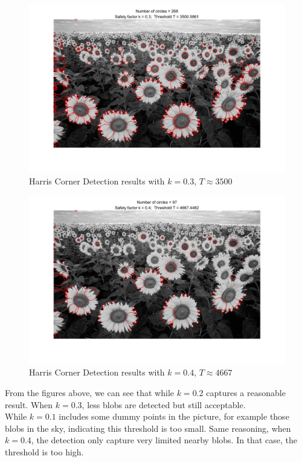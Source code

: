 \documentclass[letterpaper]{article}
\begin{document}
\begin{figure}[H]
\begin{center}
\includegraphics[width = 14cm]{HW4_q2_k_03.jpeg}
\end{center}
\caption{Harris Corner Detection results with $k=0.3$, $T\approx 3500$}
\label{HW4_q2_k_03}
\end{figure}

\begin{figure}[H]
\begin{center}
\includegraphics[width = 14cm]{HW4_q2_k_04.jpeg}
\end{center}
\caption{Harris Corner Detection results with $k=0.4$, $T\approx 4667$}
\label{HW4_q2_k_04}
\end{figure}

From the figures above, we can see that while $k = 0.2$ captures a reasonable result. When $k = 0.3$, less blobs are detected but still acceptable. \\
While $k = 0.1$ includes some dummy points in the picture, for example those blobs in the sky, indicating this threshold is too small. Same reasoning, when $k = 0.4$, the detection only capture very limited nearby blobs. In that case, the threshold is too high. \\
\end{document}
